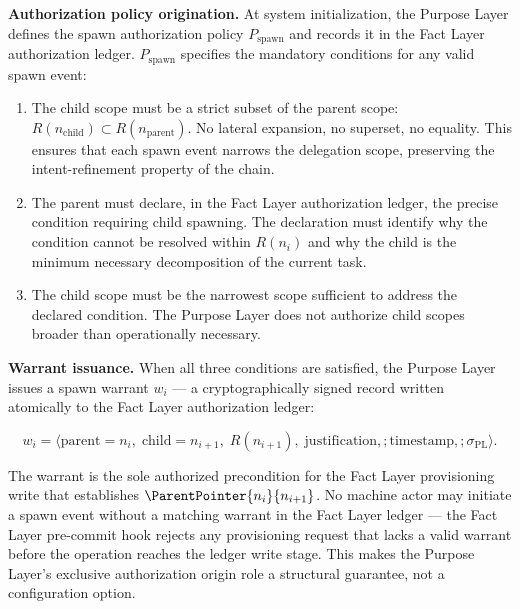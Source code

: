 \medskip
\noindent\textbf{Authorization policy origination.} At system initialization, the Purpose Layer defines the spawn authorization policy $P_{\text{spawn}}$ and records it in the Fact Layer authorization ledger. $P_{\text{spawn}}$ specifies the mandatory conditions for any valid spawn event:

\begin{enumerate}
    \item[(S1) \textbf{Scope refinement}] The child scope must be a strict subset of the parent scope: $R(n_{\text{child}}) \subset R(n_{\text{parent}})$. No lateral expansion, no superset, no equality. This ensures that each spawn event narrows the delegation scope, preserving the intent-refinement property of the chain.

    \item[(S2) \textbf{Operational necessity}] The parent must declare, in the Fact Layer authorization ledger, the precise condition requiring child spawning. The declaration must identify why the condition cannot be resolved within $R(n_i)$ and why the child is the minimum necessary decomposition of the current task.

    \item[(S3) \textbf{Minimum scope proportionality}] The child scope must be the narrowest scope sufficient to address the declared condition. The Purpose Layer does not authorize child scopes broader than operationally necessary.
\end{enumerate}

\medskip
\noindent\textbf{Warrant issuance.} When all three conditions are satisfied, the Purpose Layer issues a spawn warrant $w_i$ --- a cryptographically signed record written atomically to the Fact Layer authorization ledger:

\begin{equation}
w_i = \bigl\langle
\text{parent}=n_i,\;
\text{child}=n_{i+1},\;
R(n_{i+1}),\;
\text{justification},;
\text{timestamp},;
\sigma_{\text{PL}}
\bigr\rangle .
\label{eq:spawn-warrant}
\end{equation}

The warrant is the sole authorized precondition for the Fact Layer provisioning write that establishes $\ParentPointer{n_i}{n_{i+1}}$. No machine actor may initiate a spawn event without a matching warrant in the Fact Layer ledger --- the Fact Layer pre-commit hook rejects any provisioning request that lacks a valid warrant before the operation reaches the ledger write stage. This makes the Purpose Layer's exclusive authorization origin role a structural guarantee, not a configuration option.

